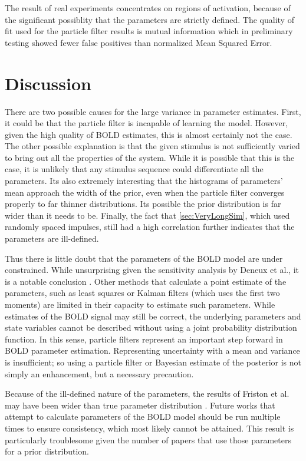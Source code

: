 \documentclass[journal]{./IEEEtran}
\begin{document}
The result of real experiments concentrates on regions of activation, because
of the significant possiblity that the parameters are strictly defined. The
quality of fit used for the particle filter results is mutual information which
in preliminary testing showed fewer false positives than normalized Mean Squared
Error. 

\section{Discussion}
\label{sec:Discussion}

There are two possible causes for the large variance in
parameter estimates. First, it could be that the particle filter is
incapable of learning the model. However, given the high quality
of BOLD estimates, this is almost certainly not the case. The other
possible explanation is that the given stimulus is not sufficiently
varied to bring out all the properties of the system. While it is
possible that this is the case, it is unlikely that any
stimulus sequence could differentiate all the parameters.
Its also extremely interesting that the histograms of parameters' mean
approach the width of the prior, even when the particle filter converges
properly to far thinner distributions. Its possible the prior
distribution is far wider than
it needs to be. Finally, the fact that \autoref{sec:VeryLongSim}, which
used randomly spaced impulses,
still had a high correlation further indicates that the parameters
are ill-defined.

Thus there is little doubt that the parameters of the BOLD model are under
constrained. While unsurprising given the sensitivity analysis by Deneux et al.,
it is a notable conclusion \cite{Deneux2006}. Other methods
that calculate a point estimate of the parameters, such as least squares
or Kalman filters (which uses the first two moments) are limited in their
capacity to estimate such parameters. While estimates of
the  BOLD signal may still be correct, the
underlying parameters and state variables cannot be described without using
a joint probability distribution function. In this sense, particle
filters represent an important step forward in BOLD parameter
estimation. Representing uncertainty with a mean
and variance is insufficient; so using a particle filter
or Bayesian estimate of the posterior is not simply an enhancement,
but a necessary precaution.

Because of the ill-defined nature of the parameters, the results
of Friston et al. may have been wider than true parameter distribution
\cite{Friston2002}. Future works that attempt to calculate parameters
of the BOLD model should be run multiple times to ensure consistency,
which most likely cannot be attained. This result is particularly
troublesome given the number of papers that use those parameters for
a prior distribution.
\end{document}
